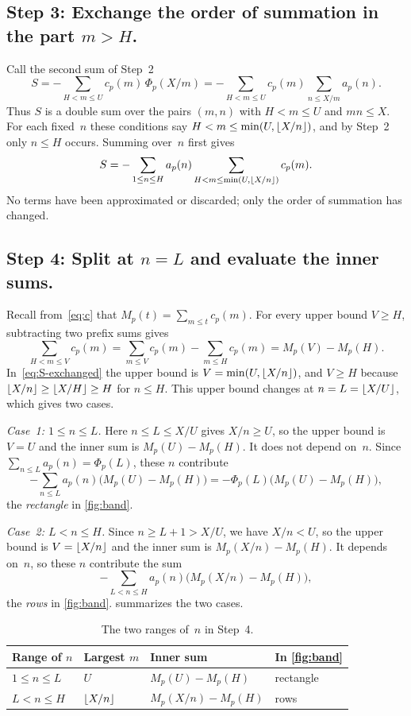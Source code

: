 \documentclass[11pt,a4paper]{amsart}
\numberwithin{equation}{section}
\DeclarePairedDelimiter{\floor}{\lfloor}{\rfloor}
\newcommand{\step}[1]{\subsection*{#1}}
\begin{document}
\step{Step 3: Exchange the order of summation in the part \texorpdfstring{$m>H$}{m > H}.}
Call the second sum of Step~2
\[
  S=-\sum_{H<m\le U}c_p(m)\,\Phi_p(X/m)
   =-\sum_{H<m\le U}c_p(m)\sum_{n\le X/m}a_p(n).
\]
Thus $S$ is a double sum over the pairs $(m,n)$ with $H<m\le U$ and
$mn\le X$. For each fixed~$n$ these conditions say
$H<m\le\min(U,\floor{X/n})$, and by Step~2 only $n\le H$ occurs. Summing
over~$n$ first gives
\begin{equation}\label{eq:S-exchanged}
  S=-\sum_{1\le n\le H}a_p(n)\sum_{H<m\le\min(U,\floor{X/n})}c_p(m).
\end{equation}
No terms have been approximated or discarded; only the order of summation has
changed.

\step{Step 4: Split at \texorpdfstring{$n=L$}{n = L} and evaluate the inner sums.}
Recall from~\eqref{eq:c} that $M_p(t)=\sum_{m\le t}c_p(m)$. For every upper
bound $V\ge H$, subtracting two prefix sums gives
\[
  \sum_{H<m\le V}c_p(m)=\sum_{m\le V}c_p(m)-\sum_{m\le H}c_p(m)
  =M_p(V)-M_p(H).
\]
In~\eqref{eq:S-exchanged} the upper bound is $V=\min(U,\floor{X/n})$, and
$V\ge H$ because $\floor{X/n}\ge\floor{X/H}\ge H$ for $n\le H$. This upper
bound changes at $n=L=\floor{X/U}$, which gives two cases.

\emph{Case~1: $1\le n\le L$.} Here $n\le L\le X/U$ gives $X/n\ge U$, so the
upper bound is $V=U$ and the inner sum is $M_p(U)-M_p(H)$. It does not depend
on~$n$. Since $\sum_{n\le L}a_p(n)=\Phi_p(L)$, these $n$ contribute
\[
  -\sum_{n\le L}a_p(n)\bigl(M_p(U)-M_p(H)\bigr)
  =-\Phi_p(L)\bigl(M_p(U)-M_p(H)\bigr),
\]
the \emph{rectangle} in \cref{fig:band}.

\emph{Case~2: $L<n\le H$.} Since $n\ge L+1>X/U$, we have $X/n<U$, so the upper
bound is $V=\floor{X/n}$ and the inner sum is $M_p(X/n)-M_p(H)$. It depends
on~$n$, so these $n$ contribute the sum
\[
  -\sum_{L<n\le H}a_p(n)\bigl(M_p(X/n)-M_p(H)\bigr),
\]
the \emph{rows} in \cref{fig:band}.  summarizes the two cases.

\begin{table}[htb]
\caption{The two ranges of~$n$ in Step~4.}\label{tab:ranges}
\centering
\begin{tabular}{@{}llll@{}}
\toprule
Range of $n$ & Largest $m$ & Inner sum & In \cref{fig:band}\\
\midrule
$1\le n\le L$ & $U$ & $M_p(U)-M_p(H)$ & rectangle\\
$L<n\le H$ & $\floor{X/n}$ & $M_p(X/n)-M_p(H)$ & rows\\
\bottomrule
\end{tabular}
\end{table}
\end{document}
